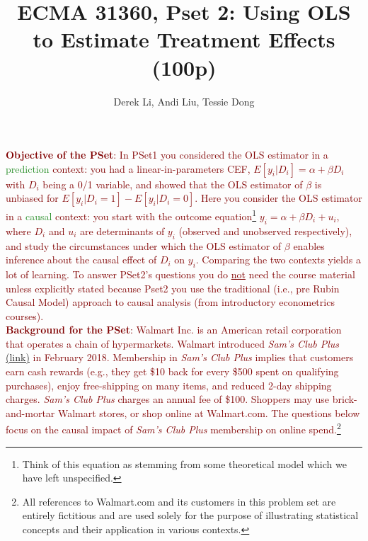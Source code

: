 \documentclass{article}
\begin{document}
\title{ECMA 31360, Pset 2: Using OLS to Estimate Treatment Effects (100p)}
\date{}
\author{Derek Li, Andi Liu, Tessie Dong}
\maketitle
\thispagestyle{fancy}



\noindent \textcolor{Maroon}{\textbf{Objective of the PSet}: In PSet1 you considered the OLS estimator in a \textcolor{ForestGreen}{prediction} context: you had a linear-in-parameters CEF, $E[y_i|D_i]=\alpha+\beta D_i$ with $D_i$ being a 0/1 variable, and showed that the OLS estimator of $\beta$ is unbiased for $E[y_i|D_i=1]-E[y_i|D_i=0]$. Here you consider the OLS estimator in a \textcolor{ForestGreen}{causal} context: you start with the outcome equation\footnote{Think of this equation as stemming from some theoretical model which we have left unspecified.} $y_i=\alpha+\beta D_i + u_i$, where $D_i$ and $u_i$ are determinants of $y_i$ (observed and unobserved respectively), and study the circumstances under which the OLS estimator of $\beta$ enables inference about the causal effect of $D_i$ on $y_i$. Comparing the two contexts yields a lot of learning. To answer PSet2's questions you do \underline{not} need the course material unless explicitly stated because Pset2 you use the traditional (i.e., pre Rubin Causal Model) approach to causal analysis (from introductory econometrics courses).} \\

\noindent \textcolor{Maroon}{\textbf{Background for the PSet}: Walmart Inc. is an American retail corporation that operates a chain of hypermarkets. Walmart introduced \textit{Sam's Club Plus} \href{https://www.samsclub.com/sams/pagedetails/content.jsp?pageName=aboutSams&xid=hpg_member_3}{(link)} in February 2018. Membership in \textit{Sam's Club Plus} implies that customers earn cash rewards (e.g., they get \$10 back for every \$500 spent on qualifying purchases), enjoy free-shipping on many items, and reduced 2-day shipping charges. \textit{Sam's Club Plus} charges an annual fee of \$100. Shoppers may use brick-and-mortar Walmart stores, or shop online at Walmart.com. The questions below focus on the causal impact of \textit{Sam's Club Plus} membership on online spend.}\footnote{All references to Walmart.com and its customers in this problem set are entirely fictitious and are used solely for the purpose of illustrating
statistical concepts and their application in various contexts.}
\end{document}
